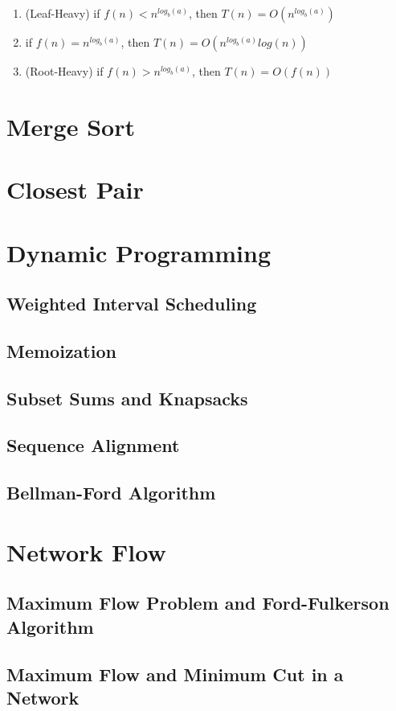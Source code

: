 \documentclass{article}
\begin{document}
\begin{enumerate}
    \item (Leaf-Heavy) if $f(n) < n^{log_b(a)}$, then  $T(n) = O(n^{log_b(a)})$
    \item if $f(n) = n^{log_b(a)}$, then $T(n) = O(n^{log_b(a)}log(n))$
    \item (Root-Heavy) if $f(n) > n^{log_b(a)}$, then $T(n) = O(f(n))$
\end{enumerate}

\section{Merge Sort}
\section{Closest Pair}
\section{Dynamic Programming}
\subsection{Weighted Interval Scheduling}
\subsection{Memoization}
\subsection{Subset Sums and Knapsacks}
\subsection{Sequence Alignment}
\subsection{Bellman-Ford Algorithm}
\section{Network Flow}
\subsection{Maximum Flow Problem and Ford-Fulkerson Algorithm}
\subsection{Maximum Flow and Minimum Cut in a Network}
\end{document}
